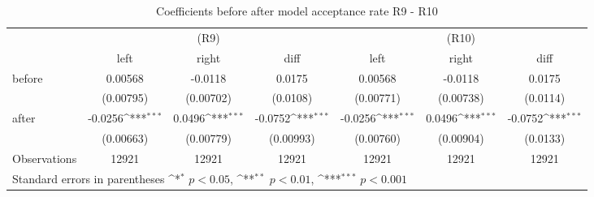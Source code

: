 \begin{table}[!ht]\centering \footnotesize
\def\sym#1{\ifmmode^{#1}\else\(^{#1}\)\fi}
\caption{Coefficients before after model acceptance rate R9 - R10}
\begin{tabular}{l*{6}{c}}
\hline\hline
                    &\multicolumn{3}{c}{(R9)}&\multicolumn{3}{c}{(R10)}\\
&\multicolumn{1}{c}{left}&\multicolumn{1}{c}{right}&\multicolumn{1}{c}{diff}&\multicolumn{1}{c}{left}&\multicolumn{1}{c}{right}&\multicolumn{1}{c}{diff}\\
\hline
before              &     0.00568         &     -0.0118         &      0.0175         &     0.00568         &     -0.0118         &      0.0175         \\
                    &   (0.00795)         &   (0.00702)         &    (0.0108)         &   (0.00771)         &   (0.00738)         &    (0.0114)         \\
[0,5em]
after               &     -0.0256\sym{***}&      0.0496\sym{***}&     -0.0752\sym{***}&     -0.0256\sym{***}&      0.0496\sym{***}&     -0.0752\sym{***}\\
                    &   (0.00663)         &   (0.00779)         &   (0.00993)         &   (0.00760)         &   (0.00904)         &    (0.0133)         \\
\hline
Observations        &       12921         &       12921         &       12921         &       12921         &       12921         &       12921         \\
\hline\hline
\multicolumn{7}{l}{\footnotesize Standard errors in parentheses \sym{*} \(p<0.05\), \sym{**} \(p<0.01\), \sym{***} \(p<0.001\)}\\
\end{tabular}
\end{table}

